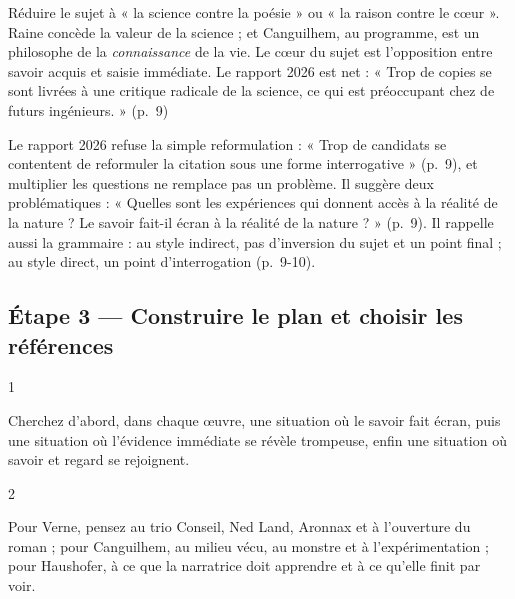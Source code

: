 \documentclass[11pt,a4paper]{article}
\begin{document}
\begin{piege}

Réduire le sujet à « la science contre la poésie » ou « la raison contre le cœur ». Raine concède la valeur de la science ; et Canguilhem, au programme, est un philosophe de la \emph{connaissance} de la vie. Le cœur du sujet est l'opposition entre savoir acquis et saisie immédiate. Le rapport 2026 est net : « Trop de copies se sont livrées à une critique radicale de la science, ce qui est préoccupant chez de futurs ingénieurs. » (p.~9)

\end{piege}

\begin{jury}

Le rapport 2026 refuse la simple reformulation : « Trop de candidats se contentent de reformuler la citation sous une forme interrogative » (p.~9), et multiplier les questions ne remplace pas un problème. Il suggère deux problématiques : « Quelles sont les expériences qui donnent accès à la réalité de la nature ? Le savoir fait-il écran à la réalité de la nature ? » (p.~9). Il rappelle aussi la grammaire : au style indirect, pas d'inversion du sujet et un point final ; au style direct, un point d'interrogation (p.~9-10).

\end{jury}

\hypertarget{uxe9tape-3-construire-le-plan-et-choisir-les-ruxe9fuxe9rences}{%
\subsection{Étape 3 --- Construire le plan et choisir les références}\label{uxe9tape-3-construire-le-plan-et-choisir-les-ruxe9fuxe9rences}}

\begin{indication}{1}

Cherchez d'abord, dans chaque œuvre, une situation où le savoir fait écran, puis une situation où l'évidence immédiate se révèle trompeuse, enfin une situation où savoir et regard se rejoignent.

\end{indication}

\begin{indication}{2}

Pour Verne, pensez au trio Conseil, Ned Land, Aronnax et à l'ouverture du roman ; pour Canguilhem, au milieu vécu, au monstre et à l'expérimentation ; pour Haushofer, à ce que la narratrice doit apprendre et à ce qu'elle finit par voir.

\end{indication}
\end{document}
